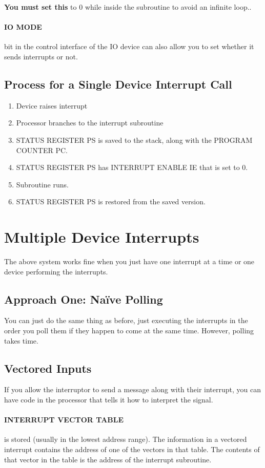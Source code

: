 \documentclass[a4paper,12pt]{report}
\begin{document}
\textbf{You must set this } to 0 while inside the subroutine to avoid an infinite loop.. 

\paragraph{IO MODE } bit in the control interface of the IO device can also allow you to set whether it sends interrupts or not.

\subsection{Process for a Single Device Interrupt Call}
\begin{enumerate}
\item Device raises interrupt
\item Processor branches to the interrupt subroutine
\item STATUS REGISTER PS is saved to the stack, along with the PROGRAM COUNTER PC.
\item STATUS REGISTER PS has INTERRUPT ENABLE IE that is set to 0. 
\item Subroutine runs.
\item STATUS REGISTER PS is restored from the saved version. 
\end{enumerate}

\section{Multiple Device Interrupts}
The above system works fine when you just have one interrupt at a time or one device performing the interrupts. 

\subsection{Approach One: Naïve Polling}
You can just do the same thing as before, just executing the interrupts in the order you poll them if they happen to come at the same time. However, 
polling takes time.

\subsection{Vectored Inputs}
If you allow the interruptor to send a message along with their interrupt, you can have code in the processor that tells it how to 
interpret the signal.

\paragraph{INTERRUPT VECTOR TABLE } is stored (usually in the lowest address range). The information in a vectored interrupt contains the 
address of one of the vectors in that table. The contents of that vector in the table is the address of the interrupt subroutine.
\end{document}
